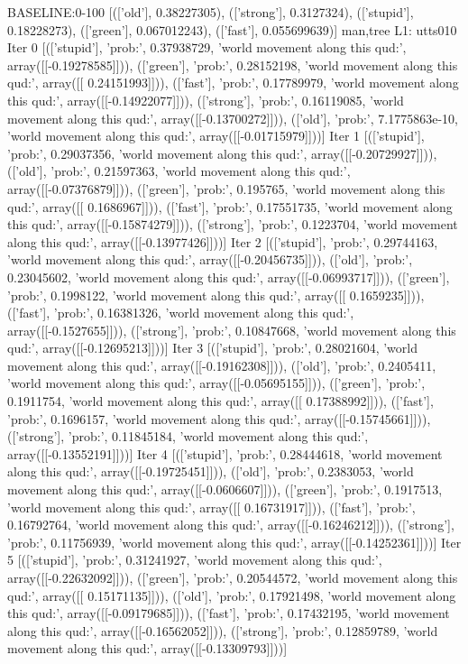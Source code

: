 BASELINE:0-100
[(['old'], 0.38227305), (['strong'], 0.3127324), (['stupid'], 0.18228273), (['green'], 0.067012243), (['fast'], 0.055699639)]
man,tree
L1: utts010
Iter 0 [(['stupid'], 'prob:', 0.37938729, 'world movement along this qud:', array([[-0.19278585]])), (['green'], 'prob:', 0.28152198, 'world movement along this qud:', array([[ 0.24151993]])), (['fast'], 'prob:', 0.17789979, 'world movement along this qud:', array([[-0.14922077]])), (['strong'], 'prob:', 0.16119085, 'world movement along this qud:', array([[-0.13700272]])), (['old'], 'prob:', 7.1775863e-10, 'world movement along this qud:', array([[-0.01715979]]))]
Iter 1 [(['stupid'], 'prob:', 0.29037356, 'world movement along this qud:', array([[-0.20729927]])), (['old'], 'prob:', 0.21597363, 'world movement along this qud:', array([[-0.07376879]])), (['green'], 'prob:', 0.195765, 'world movement along this qud:', array([[ 0.1686967]])), (['fast'], 'prob:', 0.17551735, 'world movement along this qud:', array([[-0.15874279]])), (['strong'], 'prob:', 0.1223704, 'world movement along this qud:', array([[-0.13977426]]))]
Iter 2 [(['stupid'], 'prob:', 0.29744163, 'world movement along this qud:', array([[-0.20456735]])), (['old'], 'prob:', 0.23045602, 'world movement along this qud:', array([[-0.06993717]])), (['green'], 'prob:', 0.1998122, 'world movement along this qud:', array([[ 0.1659235]])), (['fast'], 'prob:', 0.16381326, 'world movement along this qud:', array([[-0.1527655]])), (['strong'], 'prob:', 0.10847668, 'world movement along this qud:', array([[-0.12695213]]))]
Iter 3 [(['stupid'], 'prob:', 0.28021604, 'world movement along this qud:', array([[-0.19162308]])), (['old'], 'prob:', 0.2405411, 'world movement along this qud:', array([[-0.05695155]])), (['green'], 'prob:', 0.1911754, 'world movement along this qud:', array([[ 0.17388992]])), (['fast'], 'prob:', 0.1696157, 'world movement along this qud:', array([[-0.15745661]])), (['strong'], 'prob:', 0.11845184, 'world movement along this qud:', array([[-0.13552191]]))]
Iter 4 [(['stupid'], 'prob:', 0.28444618, 'world movement along this qud:', array([[-0.19725451]])), (['old'], 'prob:', 0.2383053, 'world movement along this qud:', array([[-0.0606607]])), (['green'], 'prob:', 0.1917513, 'world movement along this qud:', array([[ 0.16731917]])), (['fast'], 'prob:', 0.16792764, 'world movement along this qud:', array([[-0.16246212]])), (['strong'], 'prob:', 0.11756939, 'world movement along this qud:', array([[-0.14252361]]))]
Iter 5 [(['stupid'], 'prob:', 0.31241927, 'world movement along this qud:', array([[-0.22632092]])), (['green'], 'prob:', 0.20544572, 'world movement along this qud:', array([[ 0.15171135]])), (['old'], 'prob:', 0.17921498, 'world movement along this qud:', array([[-0.09179685]])), (['fast'], 'prob:', 0.17432195, 'world movement along this qud:', array([[-0.16562052]])), (['strong'], 'prob:', 0.12859789, 'world movement along this qud:', array([[-0.13309793]]))]

